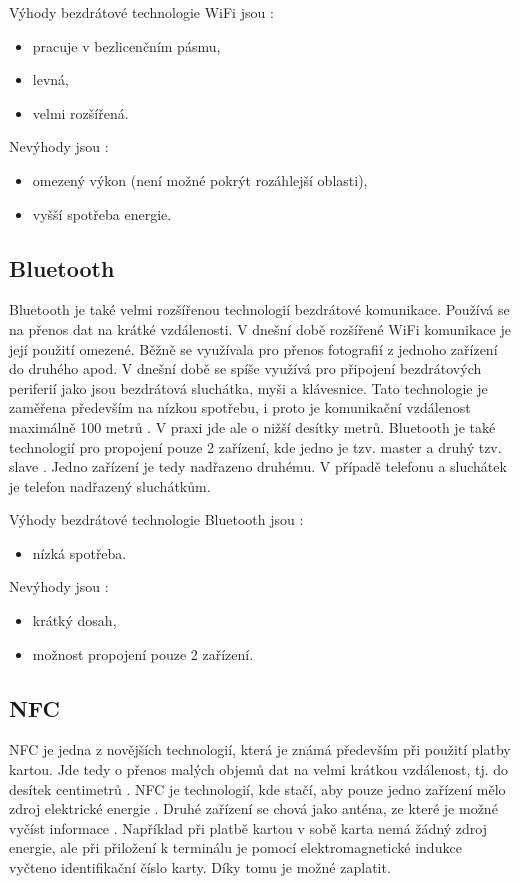 Výhody bezdrátové technologie WiFi jsou \cite{Bezdrat_muni}:
\begin{itemize}
  \item pracuje v bezlicenčním pásmu, 
  \item levná, 
  \item velmi rozšířená.
\end{itemize}

Nevýhody jsou \cite{Bezdrat_muni}:
\begin{itemize}
  \item omezený výkon (není možné pokrýt rozáhlejší oblasti), 
  \item vyšší spotřeba energie.
\end{itemize}

\subsection{Bluetooth}
Bluetooth je také velmi rozšířenou technologií bezdrátové komunikace. Používá se na přenos dat na krátké vzdálenosti. V dnešní době 
rozšířené WiFi komunikace je její použití omezené. Běžně se využívala pro přenos fotografií z jednoho zařízení do druhého apod. V dnešní 
době se spíše využívá pro připojení bezdrátových periferií jako jsou bezdrátová sluchátka, myši a klávesnice. Tato technologie je zaměřena 
především na nízkou spotřebu, i proto je komunikační vzdálenost maximálně 100 metrů \cite{Bezdrat_muni}. V praxi jde ale o nižší desítky
metrů. Bluetooth je také technologií pro propojení pouze 2 zařízení, kde jedno je tzv. master a druhý tzv. slave \cite{Bezdrat_muni}. 
Jedno zařízení je tedy nadřazeno druhému. V případě telefonu a sluchátek je telefon nadřazený sluchátkům. 

Výhody bezdrátové technologie Bluetooth jsou \cite{Bezdrat_muni}:
\begin{itemize}
  \item nízká spotřeba.
\end{itemize}

Nevýhody jsou \cite{Bezdrat_muni}:
\begin{itemize}
  \item krátký dosah,
  \item možnost propojení pouze 2 zařízení.
\end{itemize}

\subsection{NFC}
NFC je jedna z novějších technologií, která je známá především při použití platby kartou. Jde tedy o přenos malých objemů dat na velmi krátkou 
vzdálenost, tj. do desítek centimetrů \cite{Bezdrat_muni}. NFC je technologií, kde stačí, aby pouze jedno zařízení mělo zdroj elektrické 
energie \cite{Bezdrat_muni}. Druhé zařízení se chová jako anténa, ze které je možné vyčíst informace \cite{Bezdrat_muni}. Například při 
platbě kartou v sobě karta nemá žádný zdroj energie, ale při přiložení k terminálu je pomocí elektromagnetické indukce vyčteno identifikační
číslo karty. Díky tomu je možné zaplatit. 

